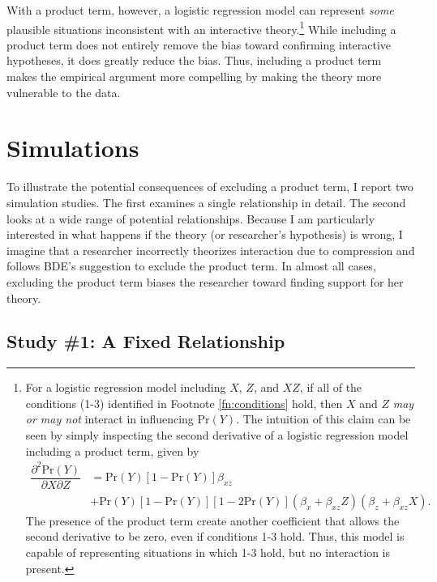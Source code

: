 \documentclass[12pt]{article}
\begin{document}
With a product term, however, a logistic regression model can represent \textit{some} plausible situations inconsistent with an interactive theory.\footnote{For a logistic regression model including $X$, $Z$, and $XZ$, if all of the conditions (1-3) identified in Footnote \ref{fn:conditions} hold, then $X$ and $Z$ \textit{may or may not} interact in influencing Pr$(Y)$. The intuition of this claim can be seen by simply inspecting the second derivative of a logistic regression model including a product term, given by
\begin{align}
\dfrac{\partial^2 \text{Pr}(Y)}{\partial X \partial Z} &= \text{Pr}(Y)[1 - \text{Pr}(Y)]\beta_{xz} \nonumber\\
&+ \text{Pr}(Y)[1 - \text{Pr}(Y)][1 - 2\text{Pr}(Y)](\beta_x + \beta_{xz}Z )(\beta_z + \beta_{xz}X). \nonumber
\end{align}
The presence of the product term create another coefficient that allows the second derivative to be zero, even if conditions 1-3 hold. Thus, this model is capable of representing situations in which 1-3 hold, but no interaction is present. }
While including a product term does not entirely remove the bias toward confirming interactive hypotheses, it does greatly reduce the bias. Thus, including a product term makes the empirical argument more compelling by making the theory more vulnerable to the data.

\section*{Simulations}

To illustrate the potential consequences of excluding a product term, I report two simulation studies. The first examines a single relationship in detail. The second looks at a wide range of potential relationships. Because I am particularly interested in what happens if the theory (or researcher's hypothesis) is wrong, I imagine that a researcher incorrectly theorizes interaction due to compression and follows BDE's suggestion to exclude the product term. In almost all cases, excluding the product term biases the researcher toward finding support for her theory.

\subsection*{Study \#1: A Fixed Relationship} 
\end{document}
